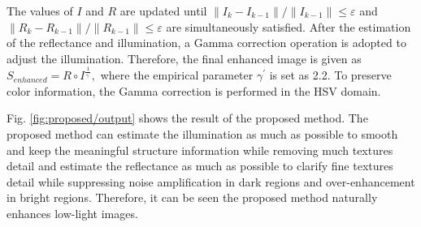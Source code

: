The values of $I$ and $R$ are updated until $\|I_{k}-I_{k-1}\|/\|I_{k-1}\| \leq \varepsilon$ and $\|R_{k}-R_{k-1}\|/\|R_{k-1}\| \leq \varepsilon$ are simultaneously satisfied. After the estimation of  the reflectance and illumination, a Gamma correction operation is adopted to adjust the illumination. Therefore, the final enhanced image is given as $ S_{enhanced} = R \circ I^{\frac{1}{\gamma^{'}}}, \label{eq_final}$ where the empirical parameter $\gamma^{'}$ is set as 2.2. To preserve color information, the Gamma correction is performed in the HSV domain.

Fig. \ref{fig:proposed/output} shows the result of the proposed method. The proposed method can estimate the illumination as much as possible to smooth and keep the meaningful structure information while removing much textures detail and estimate the reflectance as much as possible to clarify fine textures detail while suppressing noise amplification in dark regions and over-enhancement in bright regions. Therefore, it can be seen the proposed method naturally enhances low-light images.
